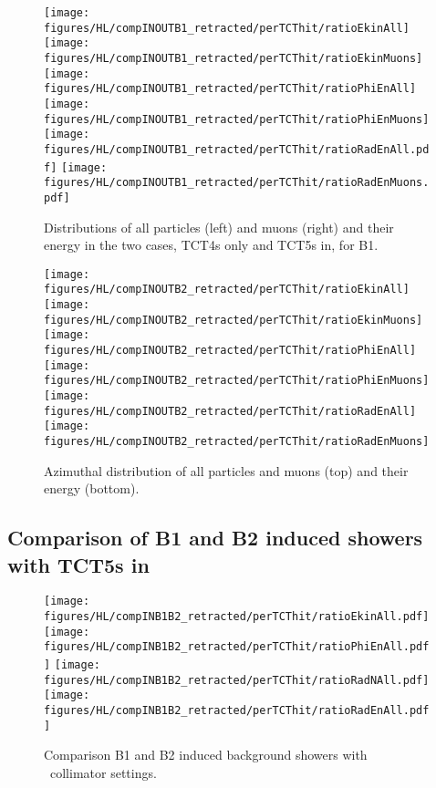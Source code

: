 \begin{figure}
\centering
\texttt{[image: figures/HL/compINOUTB1\_retracted/perTCThit/ratioEkinAll]}
\texttt{[image: figures/HL/compINOUTB1\_retracted/perTCThit/ratioEkinMuons]}
\texttt{[image: figures/HL/compINOUTB1\_retracted/perTCThit/ratioPhiEnAll]}
\texttt{[image: figures/HL/compINOUTB1\_retracted/perTCThit/ratioPhiEnMuons]}
\texttt{[image: figures/HL/compINOUTB1\_retracted/perTCThit/ratioRadEnAll.pdf]}
\texttt{[image: figures/HL/compINOUTB1\_retracted/perTCThit/ratioRadEnMuons.pdf]}
 \caption{Distributions of all particles (left) and muons (right) and their energy in the two cases, TCT4s only and TCT5s in, for B1.
  \label{fig:compInOutB1}}
\end{figure}




\begin{figure}
\begin{center}
\texttt{[image: figures/HL/compINOUTB2\_retracted/perTCThit/ratioEkinAll]}
\texttt{[image: figures/HL/compINOUTB2\_retracted/perTCThit/ratioEkinMuons]}
\texttt{[image: figures/HL/compINOUTB2\_retracted/perTCThit/ratioPhiEnAll]}
\texttt{[image: figures/HL/compINOUTB2\_retracted/perTCThit/ratioPhiEnMuons]}
\texttt{[image: figures/HL/compINOUTB2\_retracted/perTCThit/ratioRadEnAll]}
\texttt{[image: figures/HL/compINOUTB2\_retracted/perTCThit/ratioRadEnMuons]}
\end{center}
\vspace{-0.6cm}
 \caption{Azimuthal distribution of all particles and muons (top) and their energy (bottom).
  \label{fig:compInOutB2}}
\end{figure}


\subsection{Comparison of B1 and B2 induced showers with TCT5s in}


\begin{figure}
\begin{center}
\texttt{[image: figures/HL/compINB1B2\_retracted/perTCThit/ratioEkinAll.pdf]}
\texttt{[image: figures/HL/compINB1B2\_retracted/perTCThit/ratioPhiEnAll.pdf]}
\texttt{[image: figures/HL/compINB1B2\_retracted/perTCThit/ratioRadNAll.pdf]}
\texttt{[image: figures/HL/compINB1B2\_retracted/perTCThit/ratioRadEnAll.pdf]}
\end{center}
\vspace{-0.6cm}
 \caption{Comparison B1 and B2 induced background showers with \twosigmaret~collimator settings.
  \label{compINB1B2}}
\end{figure}

